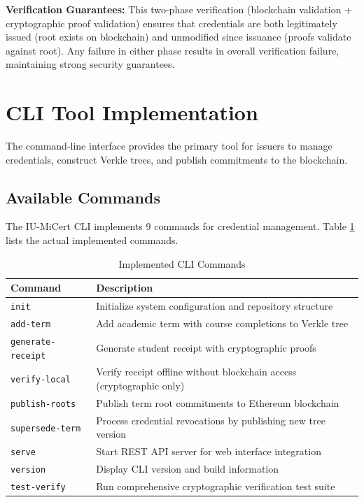 \textbf{Verification Guarantees:} This two-phase verification (blockchain validation + cryptographic proof validation) ensures that credentials are both legitimately issued (root exists on blockchain) and unmodified since issuance (proofs validate against root). Any failure in either phase results in overall verification failure, maintaining strong security guarantees.

\section{CLI Tool Implementation}
\label{sec:cli-impl}

The command-line interface provides the primary tool for issuers to manage credentials, construct Verkle trees, and publish commitments to the blockchain.

\subsection{Available Commands}
\label{subsec:cli-commands}

The IU-MiCert CLI implements 9 commands for credential management. Table \ref{tab:cli-commands} lists the actual implemented commands.

\begin{table}[H]
\centering
\caption{Implemented CLI Commands}
\label{tab:cli-commands}
\begin{tabular}{|p{4.5cm}|p{8.5cm}|}
\hline
\textbf{Command} & \textbf{Description} \\
\hline
\texttt{init} & Initialize system configuration and repository structure \\
\hline
\texttt{add-term} & Add academic term with course completions to Verkle tree \\
\hline
\texttt{generate-receipt} & Generate student receipt with cryptographic proofs \\
\hline
\texttt{verify-local} & Verify receipt offline without blockchain access (cryptographic only) \\
\hline
\texttt{publish-roots} & Publish term root commitments to Ethereum blockchain \\
\hline
\texttt{supersede-term} & Process credential revocations by publishing new tree version \\
\hline
\texttt{serve} & Start REST API server for web interface integration \\
\hline
\texttt{version} & Display CLI version and build information \\
\hline
\texttt{test-verify} & Run comprehensive cryptographic verification test suite \\
\hline
\end{tabular}
\end{table}

